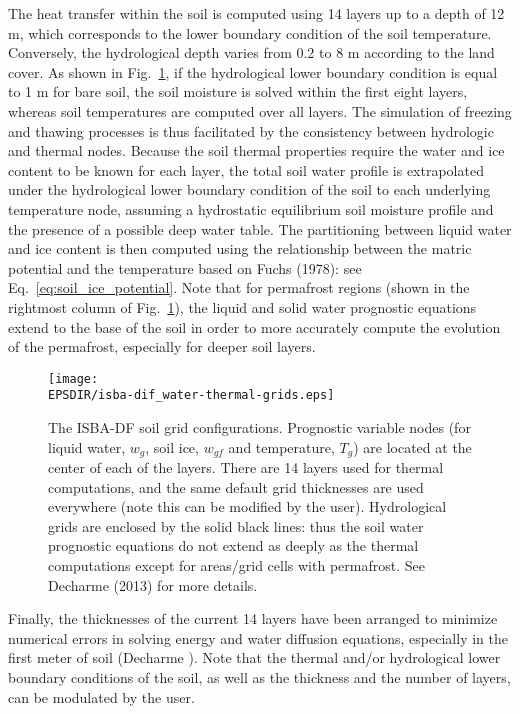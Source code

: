 The heat transfer within the soil is computed using 14
layers up to a depth of 12 m, which corresponds to the lower
boundary condition of the soil temperature. Conversely, the
hydrological depth varies from 0.2 to 8 m according to the
land cover. As shown in Fig.~\ref{fig:isba-dif_soil_grid}, 
if the hydrological
lower boundary condition is equal to 1 m for bare soil,
the soil moisture is solved within the first eight layers,
whereas soil temperatures are computed over all layers. The
simulation of freezing and thawing processes is thus facilitated 
by the consistency between hydrologic and thermal
nodes.
%
Because the soil thermal properties require the water and ice content
to be known for each layer, the total soil water profile is
extrapolated under the hydrological lower boundary condition
of the soil to each underlying temperature node, assuming
a hydrostatic equilibrium soil moisture profile and the presence of a
possible deep water table. The partitioning between liquid
water and ice content is then computed using the relationship
between the matric potential and the temperature based on
Fuchs \etal (1978): see Eq.~\ref{eq:soil_ice_potential}. 
Note that for permafrost regions
(shown in the rightmost column of Fig.~\ref{fig:isba-dif_soil_grid}), the
liquid and solid water prognostic equations extend to the base of the
soil in order to more accurately compute the evolution of the
permafrost, especially for deeper soil layers.

\begin{figure}[!b]
\centerline{ 
\texttt{[image: \\EPSDIR/isba-dif\_water-thermal-grids.eps]}}
\caption{
The ISBA-DF soil grid configurations. Prognostic variable nodes (for
liquid water, $w_g$, soil ice, $w_{gf}$ and temperature, $T_g$) are located
at the center of each of the layers. There are 14 layers used for
thermal computations, and the same default 
grid thicknesses are used everywhere (note this can be modified by the
user). Hydrological grids are enclosed
by the solid black lines: thus the soil water prognostic equations do
not extend as deeply as the thermal computations except for areas/grid
cells with permafrost. See Decharme \etal (2013) for more details.
}
\label{fig:isba-dif_soil_grid}
\end{figure}

Finally, the thicknesses of the current 14 layers have
been arranged to minimize numerical errors in solving
energy and water diffusion equations, especially in the first
meter of soil (Decharme ). Note that the thermal
and/or hydrological lower boundary conditions of the soil,
as well as the thickness and the number of layers, can be
modulated by the user.

